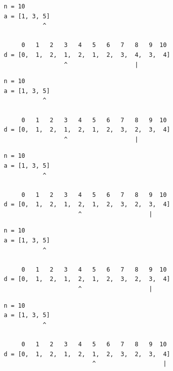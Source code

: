 \begin{frame}[fragile]
\begin{verbatim}
     n = 10
     a = [1, 3, 5]
                ^

          0   1   2   3   4   5   6   7   8   9  10
     d = [0,  1,  2,  1,  2,  1,  2,  3,  4,  3,  4]
                      ^                   |
\end{verbatim}
\end{frame}
\addtocounter{framenumber}{-1}

\begin{frame}[fragile]
\begin{verbatim}
     n = 10
     a = [1, 3, 5]
                ^

          0   1   2   3   4   5   6   7   8   9  10
     d = [0,  1,  2,  1,  2,  1,  2,  3,  2,  3,  4]
                      ^                   |
\end{verbatim}
\end{frame}
\addtocounter{framenumber}{-1}

\begin{frame}[fragile]
\begin{verbatim}
     n = 10
     a = [1, 3, 5]
                ^

          0   1   2   3   4   5   6   7   8   9  10
     d = [0,  1,  2,  1,  2,  1,  2,  3,  2,  3,  4]
                          ^                   |
\end{verbatim}
\end{frame}
\addtocounter{framenumber}{-1}

\begin{frame}[fragile]
\begin{verbatim}
     n = 10
     a = [1, 3, 5]
                ^

          0   1   2   3   4   5   6   7   8   9  10
     d = [0,  1,  2,  1,  2,  1,  2,  3,  2,  3,  4]
                          ^                   |
\end{verbatim}
\end{frame}
\addtocounter{framenumber}{-1}

\begin{frame}[fragile]
\begin{verbatim}
     n = 10
     a = [1, 3, 5]
                ^

          0   1   2   3   4   5   6   7   8   9  10
     d = [0,  1,  2,  1,  2,  1,  2,  3,  2,  3,  4]
                              ^                   |
\end{verbatim}
\end{frame}
\addtocounter{framenumber}{-1}

